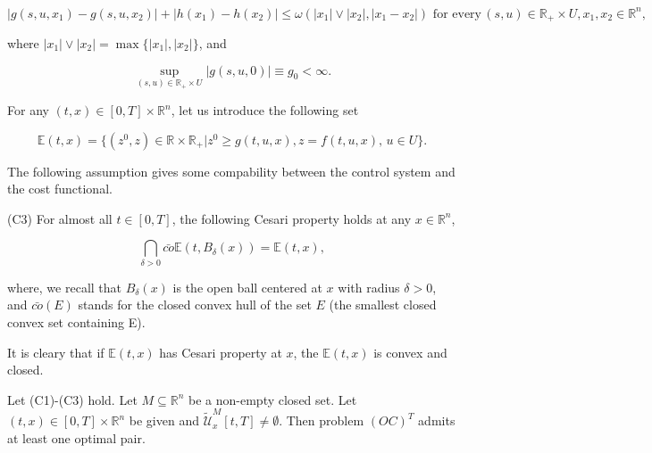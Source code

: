 $$|g(s,u,x_1)-g(s,u,x_2)|+|h(x_1)-h(x_2)|\leq \omega(|x_1|\vee 
|x_2|,|x_1-x_2|)\,\,\mbox{for every}\, (s,u)\in \mathbb{R}_{+}\times 
U,x_1,x_2\in \mathbb{R}^n,$$

where $|x_1|\vee |x_2|=\max\{|x_1|,|x_2|\}$, and

$$\sup_{(s,u)\in \mathbb{R}_{+}\times U}|g(s,u,0)|\equiv g_0<\infty.$$


For any $(t,x)\in [0,T]\times\mathbb{R}^n$, let us introduce the following set

$$\mathbb{E}(t,x)=\{(z^0,z)\in \mathbb{R}\times \mathbb{R}_{+}|z^0\geq 
g(t,u,x),z=f(t,u,x),\, u\in U\}.$$

The following assumption gives some compability between the control system and 
the cost functional.

(C3) For almost all $t\in [0,T]$, the following Cesari property holds at any 
$x\in \mathbb{R}^n$,

$$\bigcap_{\delta>0}\bar{co}\mathbb{E}(t,B_{\delta}(x))=\mathbb{E}(t,x),$$

where, we recall that $B_{\delta}(x)$ is the open ball centered at $x$ with 
radius $\delta>0$, and $\bar{co}(E)$ stands for the closed convex hull of the 
set $E$ (the smallest closed convex set containing E).

It is cleary that if $\mathbb{E}(t,x)$ has Cesari property at $x$, the 
$\mathbb{E}(t,x)$ is convex and closed.

\begin{theorem}\label{ExistsTheo}
	Let (C1)-(C3) hold. Let $M\subseteq \mathbb{R}^n$ be a non-empty closed 
	set. Let $(t,x)\in [0,T]\times\mathbb{R}^n$ be given and 
	$\tilde{\mathcal{U}}^M_x[t,T]\neq \emptyset$. Then problem $(OC)^T$ admits 
	at least one optimal pair.
\end{theorem}

